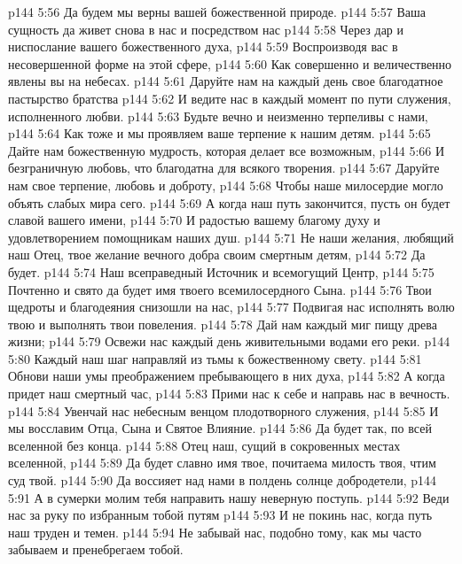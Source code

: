\vs p144 5:56 \hsetoff Да будем мы верны вашей божественной природе.
\vs p144 5:57 Ваша сущность да живет снова в нас и посредством нас
\vs p144 5:58 \hsetoff Через дар и ниспослание вашего божественного духа,
\vs p144 5:59 Воспроизводя вас в несовершенной форме на этой сфере,
\vs p144 5:60 \hsetoff Как совершенно и величественно явлены вы на небесах.
\vs p144 5:61 Даруйте нам на каждый день свое благодатное пастырство братства
\vs p144 5:62 \hsetoff И ведите нас в каждый момент по пути служения, исполненного любви.
\vs p144 5:63 Будьте вечно и неизменно терпеливы с нами,
\vs p144 5:64 \hsetoff Как тоже и мы проявляем ваше терпение к нашим детям.
\vs p144 5:65 Дайте нам божественную мудрость, которая делает все возможным,
\vs p144 5:66 \hsetoff И безграничную любовь, что благодатна для всякого творения.
\vs p144 5:67 Даруйте нам свое терпение, любовь и доброту,
\vs p144 5:68 \hsetoff Чтобы наше милосердие могло объять слабых мира сего.
\vs p144 5:69 А когда наш путь закончится, пусть он будет славой вашего имени,
\vs p144 5:70 \hsetoff И радостью вашему благому духу и удовлетворением помощникам наших душ.
\vs p144 5:71 Не наши желания, любящий наш Отец, твое желание вечного добра своим смертным детям,
\vs p144 5:72 \hsetoff Да будет.
\separatorline
\vs p144 5:74 Наш всеправедный Источник и всемогущий Центр,
\vs p144 5:75 \hsetoff Почтенно и свято да будет имя твоего всемилосердного Сына.
\vs p144 5:76 Твои щедроты и благодеяния снизошли на нас,
\vs p144 5:77 \hsetoff Подвигая нас исполнять волю твою и выполнять твои повеления.
\vs p144 5:78 Дай нам каждый миг пищу древа жизни;
\vs p144 5:79 \hsetoff Освежи нас каждый день живительными водами его реки.
\vs p144 5:80 Каждый наш шаг направляй из тьмы к божественному свету.
\vs p144 5:81 \hsetoff Обнови наши умы преображением пребывающего в них духа,
\vs p144 5:82 А когда придет наш смертный час,
\vs p144 5:83 \hsetoff Прими нас к себе и направь нас в вечность.
\vs p144 5:84 Увенчай нас небесным венцом плодотворного служения,
\vs p144 5:85 \hsetoff И мы восславим Отца, Сына и Святое Влияние.
\vs p144 5:86 Да будет так, по всей вселенной без конца.
\separatorline
\vs p144 5:88 Отец наш, сущий в сокровенных местах вселенной,
\vs p144 5:89 \hsetoff Да будет славно имя твое, почитаема милость твоя, чтим суд твой.
\vs p144 5:90 Да воссияет над нами в полдень солнце добродетели,
\vs p144 5:91 \hsetoff А в сумерки молим тебя направить нашу неверную поступь.
\vs p144 5:92 Веди нас за руку по избранным тобой путям
\vs p144 5:93 \hsetoff И не покинь нас, когда путь наш труден и темен.
\vs p144 5:94 Не забывай нас, подобно тому, как мы часто забываем и пренебрегаем тобой.
